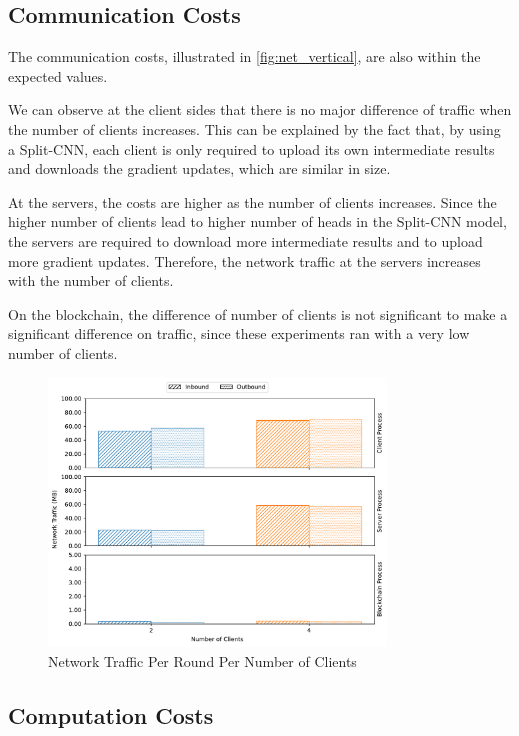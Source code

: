 \subsection{Communication Costs}

The communication costs, illustrated in \autoref{fig:net_vertical}, are also within the expected values.

We can observe at the client sides that there is no major difference of traffic when the number of clients increases. This can be explained by the fact that, by using a Split-CNN, each client is only required to upload its own intermediate results and downloads the gradient updates, which are similar in size.

At the servers, the costs are higher as the number of clients increases. Since the higher number of clients lead to higher number of heads in the Split-CNN model, the servers are required to download more intermediate results and to upload more gradient updates. Therefore, the network traffic at the servers increases with the number of clients.

On the blockchain, the difference of number of clients is not significant to make a significant difference on traffic, since these experiments ran with a very low number of clients.

\begin{figure}[!ht]
    \centering
    \centering
    \includegraphics[width=0.8\textwidth]{graphics/vertical/net.pdf}
    \caption{Network Traffic Per Round Per Number of Clients}
    \label{fig:net_vertical}
\end{figure}

\subsection{Computation Costs}

